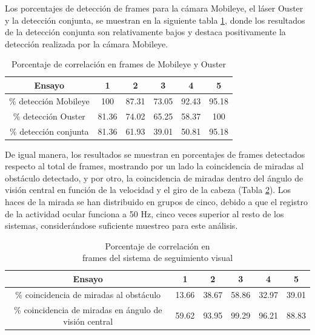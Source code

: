 \newpage
Los porcentajes de detección de frames para la cámara Mobileye, el láser Ouster y la detección conjunta, se muestran en la siguiente tabla \ref{tab:4.2}, donde los resultados de la detección conjunta son relativamente bajos y destaca positivamente la detección realizada por la cámara Mobileye.

\begin{table}[h]
\centering
\begin{tabular}{cccccc}
\textbf{Ensayo}       & \textbf{1}   & \textbf{2}     & \textbf{3}     & \textbf{4}     & \textbf{5}     \\ \hline
\% detección Mobileye & 100 & 87.31 & 73.05 & 92.43 & 95.18 \\ \hline
\% detección Ouster   & 81.36        & 74.02          & 65.25          & 58.37          & 100            \\ \hline
\% detección conjunta & 81.36        & 61.93          & 39.01          & 50.81          & 95.18         
\end{tabular}
\caption{Porcentaje de correlación en frames de Mobileye y Ouster}
\label{tab:4.2}
\end{table}

De igual manera, los resultados se muestran en porcentajes de frames detectados respecto al total de frames, mostrando por un lado la coincidencia de miradas al obstáculo detectado, y por otro, la coincidencia de miradas dentro del ángulo de visión central en función de la velocidad y el giro de la cabeza (Tabla \ref{tab:4.3}). Los haces de la mirada se han distribuido en grupos de cinco, debido a que el registro de la actividad ocular funciona a 50 Hz, cinco veces superior al resto de los sistemas, considerándose suficiente muestreo para este análisis. 

\begin{table}[h]
\centering
\begin{tabular}{cccccc}
\textbf{Ensayo}                                          & \textbf{1} & \textbf{2} & \textbf{3} & \textbf{4} & \textbf{5} \\ \hline
\% coincidencia de miradas al   obstáculo                & 13.66      & 38.67      & 58.86      & 32.97      & 39.01      \\ \hline
\% coincidencia de miradas en   ángulo de visión central & 59.62      & 93.95      & 99.29      & 96.21      & 88.83      \\ \hline
\end{tabular}
\caption{Porcentaje de correlación en \\ frames del sistema de seguimiento visual}
\label{tab:4.3}
\end{table}

